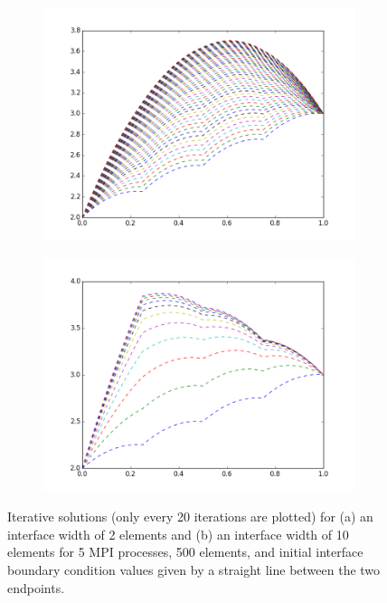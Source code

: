 \documentclass[10pt]{article}
\begin{document}
\begin{figure}[H]
        \centering
        \begin{subfigure}[b]{0.45\textwidth}
                \centering
                \includegraphics[width=\textwidth]{../figures/interface1.png}
                \caption{}
        \end{subfigure}%
                \begin{subfigure}[b]{0.45\textwidth}
                \centering
                \includegraphics[width=\textwidth]{../figures/interface2.png}
                \caption{}
        \end{subfigure}%
        \caption{Iterative solutions (only every 20 iterations are plotted) for (a) an interface width of 2 elements and (b) an interface width of 10 elements for 5 MPI processes, 500 elements, and initial interface boundary condition values given by a straight line between the two endpoints.}
        \label{fig:interface}
\end{figure}
\end{document}
